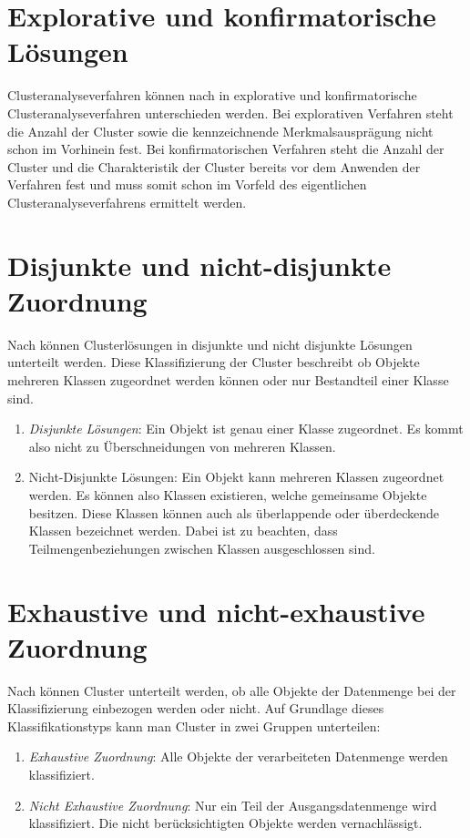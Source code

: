 \section{Explorative und konfirmatorische Lösungen}
Clusteranalyseverfahren können nach \citet[S. 22]{Bacher.2010} in explorative und konfirmatorische Clusteranalyseverfahren unterschieden werden. 
Bei explorativen Verfahren steht die Anzahl der Cluster sowie die kennzeichnende Merkmalsausprägung nicht schon im Vorhinein fest.
Bei konfirmatorischen Verfahren steht die Anzahl der Cluster und die Charakteristik der Cluster bereits vor dem Anwenden der Verfahren fest und muss somit schon im Vorfeld des eigentlichen Clusteranalyseverfahrens ermittelt werden.

\section{Disjunkte und nicht-disjunkte Zuordnung}
Nach \citet[S. 175]{Bankhofer.2008} können Clusterlösungen in disjunkte und nicht disjunkte Lösungen unterteilt werden. Diese Klassifizierung der Cluster beschreibt ob Objekte mehreren Klassen zugeordnet werden können oder nur Bestandteil einer Klasse sind.
\begin{enumerate}
    \item \textit{Disjunkte Lösungen}: Ein Objekt ist genau einer Klasse zugeordnet. Es kommt also nicht zu Überschneidungen von mehreren Klassen.
    \item {Nicht-Disjunkte Lösungen}: Ein Objekt kann mehreren Klassen zugeordnet werden. Es können also Klassen existieren, welche gemeinsame Objekte besitzen. Diese Klassen können auch als überlappende oder überdeckende Klassen bezeichnet werden. Dabei ist zu beachten, dass Teilmengenbeziehungen zwischen Klassen ausgeschlossen sind.
\end{enumerate}

\section{Exhaustive und nicht-exhaustive Zuordnung}
Nach \citet[S. 174]{Bankhofer.2008} können Cluster unterteilt werden, ob alle Objekte der Datenmenge bei der Klassifizierung einbezogen werden oder nicht. Auf Grundlage dieses Klassifikationstyps kann man Cluster in zwei Gruppen unterteilen:
\begin{enumerate}
    \item \textit{Exhaustive Zuordnung}: Alle Objekte der verarbeiteten Datenmenge werden klassifiziert.
    \item \textit{Nicht Exhaustive Zuordnung}: Nur ein Teil der Ausgangsdatenmenge wird klassifiziert. Die nicht berücksichtigten Objekte werden vernachlässigt.
\end{enumerate}

